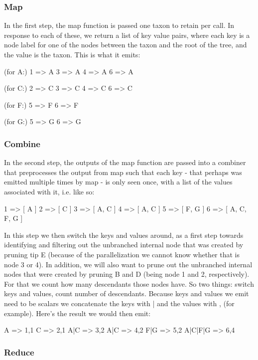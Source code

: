 \documentclass[10pt]{bmc_article}
\newenvironment{bmcformat}{\begin{raggedright}\baselineskip20pt\sloppy\setboolean{publ}{false}}{\end{raggedright}\baselineskip20pt\sloppy}
\begin{document}
\begin{bmcformat}
	\subsubsection*{Map}
		In the first step, the map function is passed one taxon to retain 
		per call. In response to each of these, we return a list of key value 
		pairs, where each key is a node label for one of the nodes between 
		the taxon and the root of the tree, and the value is the taxon. 
		This is what it emits:

		 (for A:)
		 1 => A
		 3 => A
		 4 => A
		 6 => A
		
		 (for C:)
		 2 => C
		 3 => C
		 4 => C
		 6 => C
		
		 (for F:)
		 5 => F
		 6 => F
		
		 (for G:)
		 5 => G
		 6 => G

	\subsubsection*{Combine}
		In the second step, the outputs of the map function are passed into 
		a combiner that preprocesses the output from map such that 
		each key - that perhaps was emitted multiple times by map - is only seen 
		once, with a list of the values associated with it, i.e. like so:

		 1 => [ A ]
		 2 => [ C ]
		 3 => [ A, C ]
		 4 => [ A, C ]
		 5 => [ F, G ]
		 6 => [ A, C, F, G ]

		In this step we then switch the keys and values around, as a first
		step towards identifying and filtering out the unbranched internal node 
		that was created by pruning tip E (because of the parallelization we 
		cannot know whether that is node 3 or 4). In addition, we will also 
		want to prune out the unbranched internal nodes that were created by 
		pruning B and D (being node 1 and 2, respectively). For that we count 
		how many descendants those nodes have. So two things: switch keys and 
		values, count number of descendants. Because keys and values we emit 
		need to be scalars we concatenate the keys with | and the values with , 
		(for example). Here's the result we would then emit:

		 A       => 1,1 %
		 C       => 2,1
		 A|C     => 3,2
		 A|C     => 4,2
		 F|G     => 5,2
		 A|C|F|G => 6,4

	\subsubsection*{Reduce}


\end{bmcformat}
\end{document}
